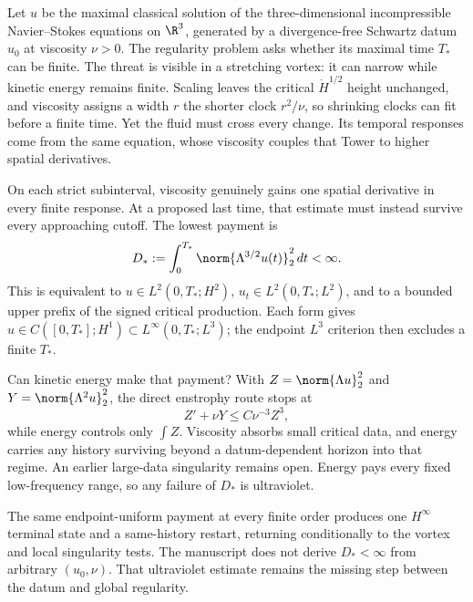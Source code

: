
Let \(u\) be the maximal classical solution of the three-dimensional
incompressible Navier--Stokes equations on \(\R^3\), generated by a
divergence-free Schwartz datum \(u_0\) at viscosity \(\nu>0\).  The regularity
problem asks whether its maximal time \(T_*\) can be finite.  The threat is
visible in a stretching vortex: it can narrow while kinetic energy remains
finite.  Scaling leaves the critical \(\dot H^{1/2}\) height unchanged, and
viscosity assigns a width \(r\) the shorter clock \(r^2/\nu\), so shrinking
clocks can fit before a finite time.  Yet the fluid must cross every change.
Its temporal responses come from the same equation, whose viscosity couples
that Tower to higher spatial derivatives.

On each strict subinterval, viscosity genuinely gains one spatial derivative
in every finite response.  At a proposed last time, that estimate must instead
survive every approaching cutoff.  The lowest payment is
\[
  D_*:=\int_0^{T_*}\norm{\Lambda^{3/2}u(t)}_2^2\,dt<\infty.
\]
This is equivalent to \(u\in L^2(0,T_*;H^2)\),
\(u_t\in L^2(0,T_*;L^2)\), and to a bounded upper prefix of the signed
critical production.  Each form gives
\(u\in C([0,T_*];H^1)\subset L^\infty(0,T_*;L^3)\); the endpoint
\(L^3\) criterion then excludes a finite \(T_*\).

Can kinetic energy make that payment?  With
\(Z=\norm{\Lambda u}_2^2\) and \(Y=\norm{\Lambda^2u}_2^2\), the direct
enstrophy route stops at
\[
  Z'+\nu Y\leq C\nu^{-3}Z^3,
\]
while energy controls only \(\int Z\).  Viscosity absorbs small critical data,
and energy carries any history surviving beyond a datum-dependent horizon into
that regime.  An earlier large-data singularity remains open.  Energy pays
every fixed low-frequency range, so any failure of \(D_*\) is ultraviolet.

The same endpoint-uniform payment at every finite order produces one
\(H^\infty\) terminal state and a same-history restart, returning conditionally
to the vortex and local singularity tests.  The manuscript does not derive
\(D_*<\infty\) from arbitrary
\((u_0,\nu)\).  That ultraviolet estimate remains the missing step between the
datum and global regularity.
